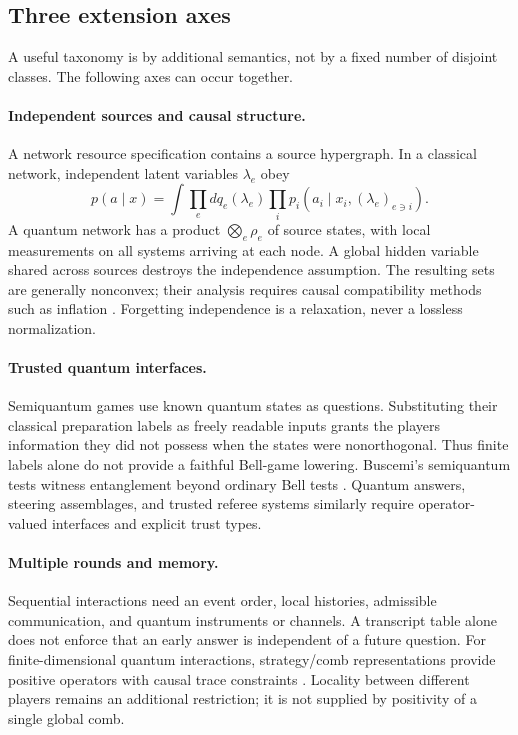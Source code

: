 \subsection{Three extension axes}
A useful taxonomy is by additional semantics, not by a fixed number of disjoint
classes. The following axes can occur together.

\paragraph{Independent sources and causal structure.}
A network resource specification contains a source hypergraph. In a classical
network, independent latent variables $\lambda_e$ obey
\begin{equation}
 p(a\mid x)=\int\prod_e dq_e(\lambda_e)
 \prod_i p_i(a_i\mid x_i,(\lambda_e)_{e\ni i}).
 \label{eq:network}
\end{equation}
A quantum network has a product $\bigotimes_e\rho_e$ of source states, with
local measurements on all systems arriving at each node. A global hidden
variable shared across sources destroys the independence assumption. The
resulting sets are generally nonconvex; their analysis requires causal
compatibility methods such as inflation \cite{fritz2012,wolfe2021}.
Forgetting independence is a relaxation, never a lossless normalization.

\paragraph{Trusted quantum interfaces.}
Semiquantum games use known quantum states as questions. Substituting their
classical preparation labels as freely readable inputs grants the players
information they did not possess when the states were nonorthogonal. Thus
finite labels alone do not provide a faithful Bell-game lowering. Buscemi's
semiquantum tests witness entanglement beyond ordinary Bell tests
\cite{buscemi2012}. Quantum answers, steering assemblages, and trusted referee
systems similarly require operator-valued interfaces and explicit trust types.

\paragraph{Multiple rounds and memory.}
Sequential interactions need an event order, local histories, admissible
communication, and quantum instruments or channels. A transcript table alone
does not enforce that an early answer is independent of a future question.
For finite-dimensional quantum interactions, strategy/comb representations
provide positive operators with causal trace constraints
\cite{gutoski2007}. Locality between different players remains an additional
restriction; it is not supplied by positivity of a single global comb.

